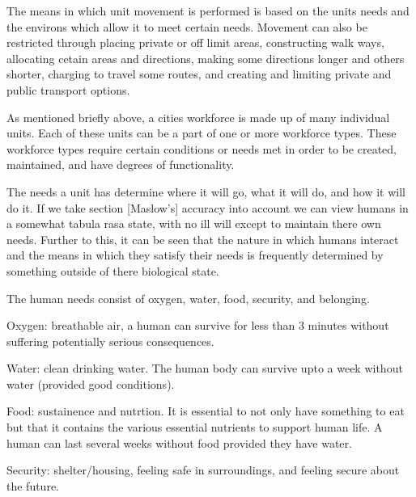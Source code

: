 The means in which unit movement is performed is based on the units needs and the environs which allow it to meet certain needs. Movement can also be restricted through placing private or off limit areas, constructing walk ways, allocating cetain areas and directions, making some directions longer and others shorter, charging to travel some routes, and creating and limiting private and public transport options. 





As mentioned briefly above, a cities workforce is made up of many individual units. Each of these units can be a part of one or more workforce types. These workforce types require certain conditions or needs met in order to be created, maintained, and have degrees of functionality. 

The needs a unit has determine where it will go, what it will do, and how it will do it. If we take section [Maslow's] accuracy into account we can view humans in a somewhat tabula rasa state, with no ill will except to maintain there own needs. Further to this, it can be seen that the nature in which humans interact and the means in which they satisfy their needs is frequently determined by something outside of there biological state. 

The human needs consist of oxygen, water, food, security, and belonging.



Oxygen: breathable air, a human can survive for less than 3 minutes without suffering potentially serious consequences. 

Water: clean drinking water. The human body can survive upto a week without water (provided good conditions). 

Food: sustainence and nutrtion. It is essential to not only have something to eat but that it contains the various essential nutrients to support human life. A human can last several weeks without food provided they have water.

Security: shelter/housing, feeling safe in surroundings, and feeling secure about the future.

